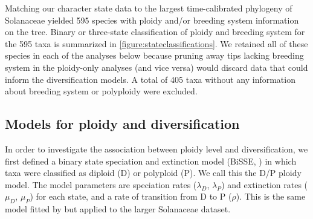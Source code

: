 Matching our character state data to the largest time-calibrated phylogeny of Solanaceae \citep{sarkinen_2013} yielded 595 species with ploidy and/or breeding system information on the tree.
Binary or three-state classification of ploidy and breeding system for the 595 taxa is summarized in \cref{figure:stateclassifications}.
We retained all of these species in each of the analyses below because pruning away tips lacking breeding system in the ploidy-only analyses (and vice versa) would discard data that could inform the diversification models.
A total of 405 taxa without any information about breeding system or polyploidy were excluded.


\subsection{Models for ploidy and diversification}

In order to investigate the association between ploidy level and diversification, we first defined a binary state speciation and extinction model (BiSSE, \citealt{maddison_2007}) in which taxa were classified as diploid (D) or polyploid (P).
We call this the D/P ploidy model.
The model parameters are speciation rates ($\lambda_D$, $\lambda_P$) and extinction rates ($\mu_D$, $\mu_P$) for each state, and a rate of transition from D to P ($\rho$). This is the same model fitted by \citet{mayrose_2011} but applied to the larger Solanaceae dataset.


